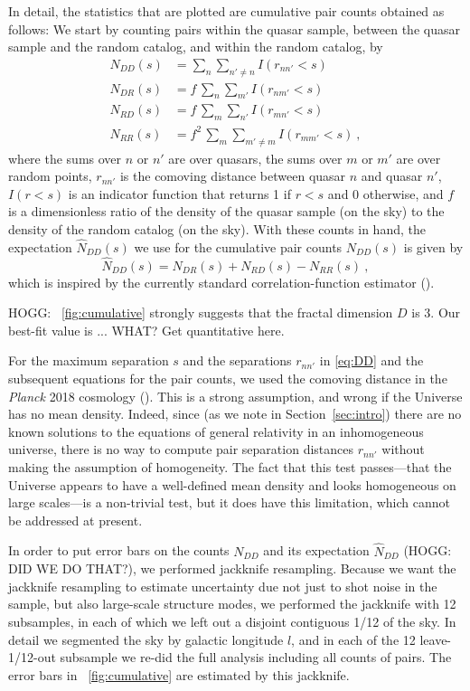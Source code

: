 \documentclass[modern]{aastex631}
\newcommand{\sectionname}{Section}
\newcommand{\secref}[1]{\sectionname~\ref{#1}}
\newcommand{\figref}[1]{\figurename~\ref{#1}}
\begin{document}
In detail, the statistics that are plotted are cumulative pair counts obtained as follows:
We start by counting pairs within the quasar sample, between the quasar sample and the random catalog, and within the random catalog, by
\begin{align}\label{eq:DD}
    N_{DD}(s) &= \sum_n \sum_{n'\ne n} I(r_{nn'} < s) \\
    N_{DR}(s) &= f\,\sum_n \sum_{m'} I(r_{nm'} < s) \\
    N_{RD}(s) &= f\,\sum_m \sum_{n'} I(r_{mn'} < s) \\
    N_{RR}(s) &= f^2\,\sum_m \sum_{m'\ne m} I(r_{mm'} < s)\label{eq:RR} ~,
\end{align}
where the sums over $n$ or $n'$ are over quasars,
the sums over $m$ or $m'$ are over random points,
$r_{nn'}$ is the comoving distance between quasar $n$ and quasar $n'$,
$I(r<s)$ is an indicator function that returns 1 if $r<s$ and 0 otherwise,
and $f$ is a dimensionless ratio of the density of the quasar sample (on the sky) to the density of the random catalog (on the sky).
With these counts in hand, the expectation $\hat{N}_{DD}(s)$ we use for the cumulative pair counts $N_{DD}(s)$ is given by
\begin{equation}\label{eq:DDhat}
    \hat{N}_{DD}(s) = N_{DR}(s) + N_{RD}(s) - N_{RR}(s) ~,
\end{equation}
which is inspired by the currently standard correlation-function estimator (\citealt{ls}).

HOGG: \figref{fig:cumulative} strongly suggests that the fractal dimension $D$ is 3.
Our best-fit value is ... WHAT?
Get quantitative here.

For the maximum separation $s$ and the separations $r_{nn'}$ in \eqref{eq:DD} and the subsequent equations for the pair counts, we used the comoving distance in the \textsl{Planck} 2018 cosmology (\citealt{planck18}).
This is a strong assumption, and wrong if the Universe has no mean density.
Indeed, since (as we note in \secref{sec:intro}) there are no known solutions to the equations of general relativity in an inhomogeneous universe, there is no way to compute pair separation distances $r_{nn'}$ without making the assumption of homogeneity.
The fact that this test passes---that the Universe appears to have a well-defined mean density and looks homogeneous on large scales---is a non-trivial test, but it does have this limitation, which cannot be addressed at present.

In order to put error bars on the counts $N_{DD}$ and its expectation $\hat{N}_{DD}$ (HOGG: DID WE DO THAT?), we performed jackknife resampling.
Because we want the jackknife resampling to estimate uncertainty due not just to shot noise in the sample, but also large-scale structure modes, we performed the jackknife with 12 subsamples, in each of which we left out a disjoint contiguous 1/12 of the sky.
In detail we segmented the sky by galactic longitude $l$, and in each of the 12 leave-1/12-out subsample we re-did the full analysis including all counts of pairs.
The error bars in \figref{fig:cumulative} are estimated by this jackknife.
\end{document}
